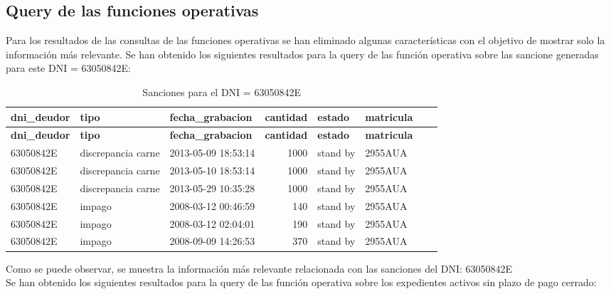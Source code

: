 \documentclass[]{article}
\begin{document}
\subsection{Query de las funciones operativas}
Para los resultados de las consultas de las funciones operativas se han eliminado algunas características con el objetivo de mostrar solo la información más relevante.
Se han obtenido los siguientes resultados para la query de las función operativa sobre las sancione generadas para este DNI = 63050842E:
\begin{table}[H]
\begin{longtable}{lllrllll}
    
    \hline
    \textbf{dni\_deudor} & \textbf{tipo} & \textbf{fecha\_grabacion} & \textbf{cantidad} &\textbf{estado} & \textbf{matricula} \\ 
    \endfirsthead

    \hline
    \textbf{dni\_deudor} & \textbf{tipo} & \textbf{fecha\_grabacion} & \textbf{cantidad} &\textbf{estado} & \textbf{matricula} \\ 
    \endhead
    
    63050842E & discrepancia carne & 2013-05-09 18:53:14 & 1000 & stand by & 2955AUA \\ \hline
    63050842E & discrepancia carne & 2013-05-10 18:53:14 & 1000 & stand by & 2955AUA \\ \hline
    63050842E & discrepancia carne & 2013-05-29 10:35:28 & 1000 & stand by & 2955AUA \\ \hline
    63050842E & impago             & 2008-03-12 00:46:59 &  140 & stand by & 2955AUA \\ \hline
    63050842E & impago             & 2008-03-12 02:04:01 &  190 & stand by & 2955AUA \\ \hline
    63050842E & impago             & 2008-09-09 14:26:53 &  370 & stand by & 2955AUA \\ \hline
    
    \end{longtable}
    \caption{Sanciones para el DNI = 63050842E}
\end{table}

Como se puede observar, se muestra la información más relevante relacionada con las sanciones del DNI: 63050842E \\

Se han obtenido los siguientes resultados para la query de las función operativa sobre los expedientes activos sin plazo de pago cerrado:
\end{document}
